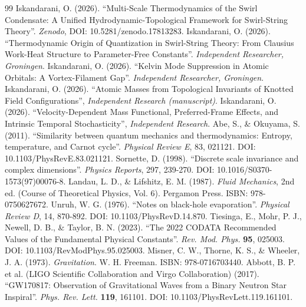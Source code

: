 \documentclass[11pt, a4paper]{article}
\begin{document}
        \begin{thebibliography}{99}
            Iskandarani, O. (2026). ``Multi-Scale Thermodynamics of the Swirl Condensate: A Unified Hydrodynamic-Topological Framework for Swirl-String Theory''. \textit{Zenodo}, DOI: 10.5281/zenodo.17813283.
            Iskandarani, O. (2026). ``Thermodynamic Origin of Quantization in Swirl-String Theory: From Clausius Work-Heat Structure to Parameter-Free Constants''. \textit{Independent Researcher, Groningen}.
            Iskandarani, O. (2026). ``Kelvin Mode Suppression in Atomic Orbitals: A Vortex-Filament Gap''. \textit{Independent Researcher, Groningen}.
            Iskandarani, O. (2026). ``Atomic Masses from Topological Invariants of Knotted Field Configurations'', \textit{Independent Research (manuscript)}.
            Iskandarani, O. (2026). ``Velocity-Dependent Mass Functional, Preferred-Frame Effects, and Intrinsic Temporal Stochasticity'', \textit{Independent Research}.
            Abe, S., \& Okuyama, S. (2011). ``Similarity between quantum mechanics and thermodynamics: Entropy, temperature, and Carnot cycle''. \textit{Physical Review E}, 83, 021121. DOI: 10.1103/PhysRevE.83.021121.
            Sornette, D. (1998). ``Discrete scale invariance and complex dimensions''. \textit{Physics Reports}, 297, 239-270. DOI: 10.1016/S0370-1573(97)00076-8.
            Landau, L. D., \& Lifshitz, E. M. (1987). \textit{Fluid Mechanics}, 2nd ed. (Course of Theoretical Physics, Vol. 6). Pergamon Press. ISBN: 978-0750627672.
            Unruh, W. G. (1976). ``Notes on black-hole evaporation''. \textit{Physical Review D}, 14, 870-892. DOI: 10.1103/PhysRevD.14.870.
            Tiesinga, E., Mohr, P. J., Newell, D. B., \& Taylor, B. N. (2023). ``The 2022 CODATA Recommended Values of the Fundamental Physical Constants''. \textit{Rev. Mod. Phys.} \textbf{95}, 025003. DOI: 10.1103/RevModPhys.95.025003.
            Misner, C. W., Thorne, K. S., \& Wheeler, J. A. (1973). \textit{Gravitation}. W. H. Freeman. ISBN: 978-0716703440.
            Abbott, B. P. et al. (LIGO Scientific Collaboration and Virgo Collaboration) (2017). ``GW170817: Observation of Gravitational Waves from a Binary Neutron Star Inspiral''. \textit{Phys. Rev. Lett.} \textbf{119}, 161101. DOI: 10.1103/PhysRevLett.119.161101.
        \end{thebibliography}
    
\end{document}
